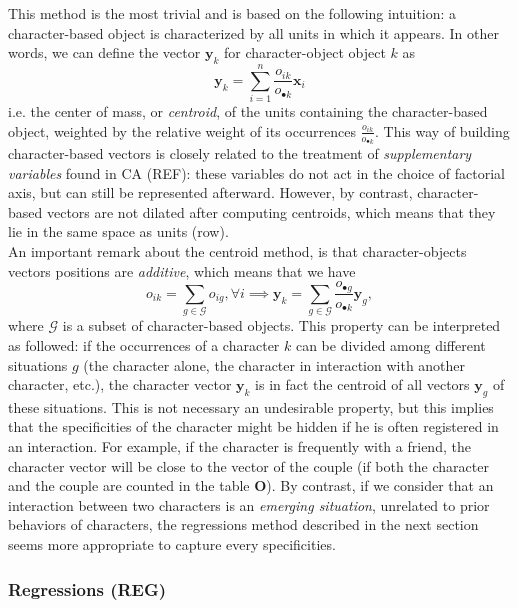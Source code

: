 \documentclass[
twocolumn,
]{ceurart}
\begin{document}
This method is the most trivial and is based on the following intuition: a character-based object is characterized by all units in which it appears. In other words, we can define the vector $\mathbf{y}_k$ for character-object object $k$ as
\begin{equation}
\mathbf{y}_k = \sum_{i=1}^n \frac{o_{ik}}{o_{\bullet k}} \mathbf{x}_i
\end{equation}
i.e. the center of mass, or \emph{centroid}, of the units containing the character-based object, weighted by the relative weight of its occurrences $\frac{o_{ik}}{o_{\bullet k}}$. This way of building character-based vectors is closely related to the treatment of \emph{supplementary variables} found in CA (REF): these variables do not act in the choice of factorial axis, but can still be represented afterward. However, by contrast, character-based vectors are not dilated after computing centroids, which means that they lie in the same space as units (row). \\
An important remark about the centroid method, is that character-objects vectors positions are \emph{additive}, which means that we have
\begin{equation}
o_{ik} = \sum_{g \in \mathcal{G}} o_{ig}, \forall i \implies \mathbf{y}_k = \sum_{g \in \mathcal{G}} \frac{o_{\bullet g}}{o_{\bullet k}} \mathbf{y}_g,
\end{equation}
where $\mathcal{G}$ is a subset of character-based objects. This property can be interpreted as followed: if the occurrences of a character $k$ can be divided among different situations $g$ (the character alone, the character in interaction with another character, etc.), the character vector $\mathbf{y}_k$ is in fact the centroid of all vectors $\mathbf{y}_g$ of these situations. This is not necessary an undesirable property, but this implies that the specificities of the character might be hidden if he is often registered in an interaction. For example, if the character is frequently with a friend, the character vector will be close to the vector of the couple (if both the character and the couple are counted in the table $\mathbf{O}$). By contrast, if we consider that an interaction between two characters is an \emph{emerging situation}, unrelated to prior behaviors of characters, the regressions method described in the next section seems more appropriate to capture every specificities.

\subsubsection{Regressions (REG)}
\label{regression}
\end{document}
